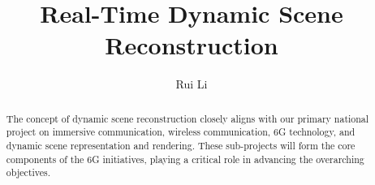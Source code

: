 \documentclass[lettersize,journal,onecolumn]{IEEEtran}
\begin{document}
\title{Real-Time Dynamic Scene Reconstruction}

\author{Rui Li}



\maketitle

\def\eg{\emph{e.g.}}
\def\Eg{\emph{E.g.}}
\def\etal{\emph{et al.}}

\newcommand\todo[1]{{\color{orange}TODO: #1}}
\newcommand\revised[1]{{\color{red}#1}}
\newcommand\idea[1]{{\color{blue}IDEA:#1}}
\newcommand\eqnref[1]{Eqn.~(\ref{#1})}
\newcommand\figref[1]{Fig.~(\ref{#1})}
\newcommand\secref[1]{Sec.~\ref{#1}}
\newcommand\tabref[1]{Tab.~\ref{#1}}

\newcommand{\T}{\mathbf{T}}
\newcommand{\svl}{\hat{\mathbf{s}}} %
\newcommand{\svg}{\mathbf{s}} %
\newcommand{\svt}{\mathbf{S}} %
\newcommand\mm[1]{\mathcal{#1}}
\newcommand\sv[1]{\mathcal{#1}}
\newcommand{\note}[1]{{\em{\textcolor{orange}{#1}}}}

\begin{abstract}
The concept of dynamic scene reconstruction closely aligns with our primary national project on immersive communication, wireless communication, 6G technology, and dynamic scene representation and rendering. These sub-projects will form the core components of the 6G initiatives, playing a critical role in advancing the overarching objectives.
\end{abstract}



%
%
%



%
%
%
%
%
%
%
%
%
%
%	
%	
\vfill
\end{document}
